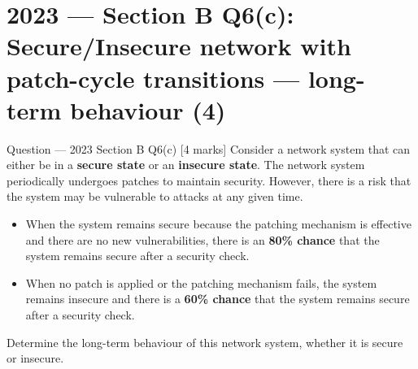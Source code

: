 \documentclass[12pt,a4paper]{article}
\begin{document}
\section{2023 --- Section B Q6(c): Secure/Insecure network with patch-cycle transitions --- long-term behaviour (4)}

\begin{qbox}{Question --- 2023 Section B Q6(c) \hfill [4 marks]}
Consider a network system that can either be in a \textbf{secure state} or an \textbf{insecure state}. The network system periodically undergoes patches to maintain security. However, there is a risk that the system may be vulnerable to attacks at any given time.
\begin{itemize}[noitemsep]
  \item[(i)] When the system remains secure because the patching mechanism is effective and there are no new vulnerabilities, there is an \textbf{80\% chance} that the system remains secure after a security check.
  \item[(ii)] When no patch is applied or the patching mechanism fails, the system remains insecure and there is a \textbf{60\% chance} that the system remains secure after a security check.
\end{itemize}
Determine the long-term behaviour of this network system, whether it is secure or insecure.
\end{qbox}
\end{document}
